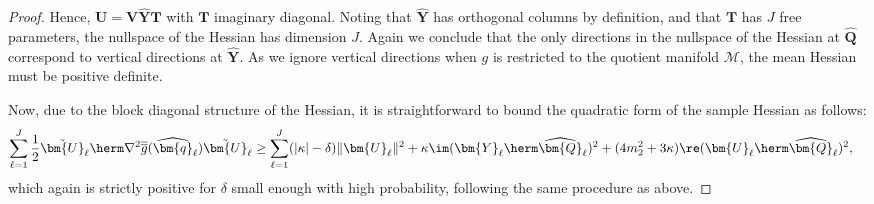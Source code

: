 \begin{proof}
	Hence, $\bm{U}=\bm{V}\widehat{\bm{Y}}\bm{T}$ with $\bm{T}$ imaginary diagonal. Noting that $\widehat{\bm{Y}}$ has orthogonal columns by definition, and that $\bm{T}$ has $J$ free parameters, the nullspace of the Hessian has dimension $J$. Again we conclude that the only directions in the nullspace of the Hessian at $\widehat{\bm{Q}}$ correspond to vertical directions at $\widehat{\bm{Y}}$. As we ignore vertical directions when $g$ is restricted to the quotient manifold $\mathcal{M}$, the mean Hessian must be positive definite.
	
	Now, due to the block diagonal structure of the Hessian, it is straightforward to bound the quadratic form of the sample Hessian as follows:
	\begin{align}
		\sum_{\ell=1}^J\frac{1}{2}
		\tilde{\bm{U}}_{\ell}
		\herm
		\nabla^2 \overline{\overline{g}}(\widehat{\bm{q}}_{\ell})
		\tilde{\bm{U}}_{\ell}
		&\geq \sum_{\ell=1}^J(|\kappa|-\delta)\|\bm{U}_{\ell}\|^2+\kappa\im(\bm{Y}_{\ell}\herm\widehat{\bm{Q}}_{\ell})^2
		+(4m_2^2+3\kappa)\re(\bm{U}_{\ell}\herm\widehat{\bm{Q}}_{\ell})^2
		,\nonumber%
	\end{align}
	which again is strictly positive for $\delta$ small enough with high probability, following the same procedure as above. 
\end{proof}
				
